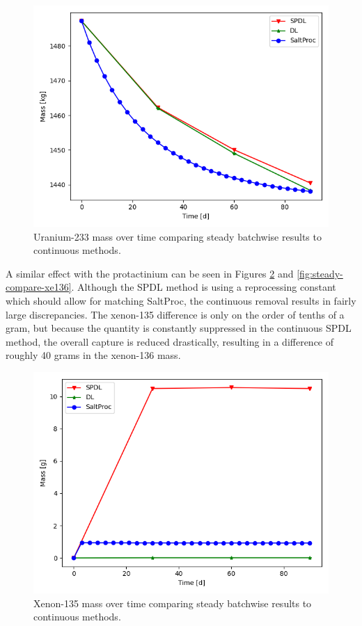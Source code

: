 \begin{figure}[H]
  \centering
  \includegraphics[scale=0.7]{images/soln-1-2-u233.png}
  \caption{Uranium-233 mass over time comparing steady batchwise results to continuous methods.}
   \label{fig:steady-compare-u233}
\end{figure}

A similar effect with the protactinium can be seen in Figures \ref{fig:steady-compare-xe135} and \ref{fig:steady-compare-xe136}. Although the SPDL method is using a reprocessing constant which should allow for matching SaltProc, the continuous removal results in fairly large discrepancies. The xenon-135 difference is only on the order of tenths of a gram, but because the quantity is constantly suppressed in the continuous SPDL method, the overall capture is reduced drastically, resulting in a difference of roughly 40 grams in the xenon-136 mass.

\begin{figure}[H]
  \centering
  \includegraphics[scale=0.7]{images/soln-1-2-xe135.png}
  \caption{Xenon-135 mass over time comparing steady batchwise results to continuous methods.}
   \label{fig:steady-compare-xe135}
\end{figure}

